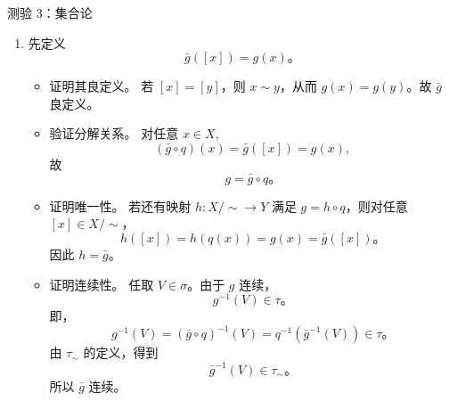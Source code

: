 \begin{frame}[allowframebreaks]{测验 3：集合论}
\begin{solution}
\begin{enumerate}[(1)]
      再证连续。任取 $U\in \tau_{\sim}$。由定义，
      \[
        q^{-1}(U)\in \tau\text{。}
      \]
      根据连续性的定义，$q$ 连续。
    \item 先定义
      \[
        \bar g([x])=g(x)\text{。}
      \]
      \begin{itemize}
        \item 证明其良定义。
          若 $[x]=[y]$，则 $x\sim y$，从而 $g(x)=g(y)$。故 $\bar g$ 良定义。
        \item 验证分解关系。
          对任意 $x\in X$,
          \[
            (\bar g\circ q)(x)=\bar g([x])=g(x),
          \]
          故
          \[
            g=\bar g\circ q\text{。}
          \]
        \item 证明唯一性。
          若还有映射 $h:X/{\sim}\to Y$ 满足 $g=h\circ q$，则对任意 $[x]\in X/{\sim}$，
          \[
            h([x])=h(q(x))=g(x)=\bar g([x])\text{。}
          \]
          因此 $h = \bar g$。
        \item 证明连续性。
          任取 $V\in \sigma$。由于 $g$ 连续，
          \[
            g^{-1}(V)\in \tau\text{。}
          \]
          即，
          \[
            g^{-1}(V)
            =
            (\bar g\circ q)^{-1}(V)
            =
            q^{-1}(\bar g^{-1}(V))
            \in \tau\text{。}
          \]
          由 $\tau_{\sim}$ 的定义，得到
          \[
            \bar g^{-1}(V)\in \tau_{\sim}\text{。}
          \]
          所以 $\bar g$ 连续。
      \end{itemize}
  \end{enumerate}
\end{solution}

\end{frame}
